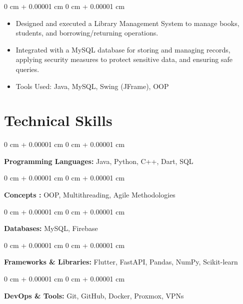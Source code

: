 \documentclass[10pt, letterpaper]{article}
\newenvironment{highlights}{
    \begin{itemize}[
        topsep=0.10 cm,
        parsep=0.10 cm,
        partopsep=0pt,
        itemsep=0pt,
        leftmargin=0 cm + 10pt
    ]
}{
    \end{itemize}
} %
\newenvironment{onecolentry}{
    \begin{adjustwidth}{
        0 cm + 0.00001 cm
    }{
        0 cm + 0.00001 cm
    }
}{
    \end{adjustwidth}
} %
\begin{document}
        \vspace{0.10 cm}
        \begin{onecolentry}
            \begin{highlights}
                \item Designed and executed a Library Management System to manage books, students, and borrowing/returning operations.
                \item Integrated with a MySQL database for storing and managing records, applying security measures to protect sensitive data, and ensuring safe queries.
                \item Tools Used: Java, MySQL, Swing (JFrame), OOP
            \end{highlights}
        \end{onecolentry}



    
    \section{Technical Skills}
        
        \begin{onecolentry}
            \textbf{Programming Languages:} Java, Python, C++, Dart, SQL
        \end{onecolentry}

        \vspace{0.2 cm}

        \begin{onecolentry}
            \textbf{Concepts :} OOP, Multithreading, Agile Methodologies
        \end{onecolentry}

        \vspace{0.2 cm}

        \begin{onecolentry}
            \textbf{Databases:} MySQL, Firebase
        \end{onecolentry}

        \vspace{0.2 cm}

        \begin{onecolentry}
            \textbf{Frameworks \& Libraries:} Flutter, FastAPI, Pandas, NumPy, Scikit-learn
        \end{onecolentry}

        \vspace{0.2 cm}

        \begin{onecolentry}
            \textbf{DevOps \& Tools:} Git, GitHub, Docker, Proxmox, VPNs
        \end{onecolentry}
\end{document}
